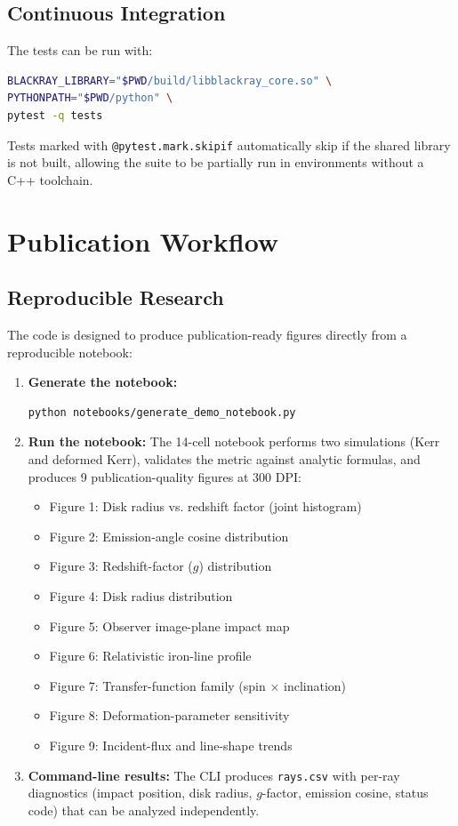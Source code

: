 \documentclass[11pt,twoside]{article}
\begin{document}
\subsection{Continuous Integration}

The tests can be run with:
\begin{lstlisting}[language=bash]
BLACKRAY_LIBRARY="$PWD/build/libblackray_core.so" \
PYTHONPATH="$PWD/python" \
pytest -q tests
\end{lstlisting}

Tests marked with \texttt{@pytest.mark.skipif} automatically skip if the shared
library is not built, allowing the suite to be partially run in environments
without a C++ toolchain.

\section{Publication Workflow}
\label{sec:workflow}

\subsection{Reproducible Research}

The code is designed to produce publication-ready figures directly from a
reproducible notebook:

\begin{enumerate}[label=\arabic*. , leftmargin=1.5em]
\item \textbf{Generate the notebook:}
\begin{lstlisting}[language=bash]
python notebooks/generate_demo_notebook.py
\end{lstlisting}

\item \textbf{Run the notebook:} The 14-cell notebook performs two simulations
(Kerr and deformed Kerr), validates the metric against analytic formulas, and
produces 9 publication-quality figures at 300 DPI:
\begin{itemize}
\item Figure 1: Disk radius vs. redshift factor (joint histogram)
\item Figure 2: Emission-angle cosine distribution
\item Figure 3: Redshift-factor ($g$) distribution
\item Figure 4: Disk radius distribution
\item Figure 5: Observer image-plane impact map
\item Figure 6: Relativistic iron-line profile
\item Figure 7: Transfer-function family (spin $\times$ inclination)
\item Figure 8: Deformation-parameter sensitivity
\item Figure 9: Incident-flux and line-shape trends
\end{itemize}

\item \textbf{Command-line results:} The CLI produces \texttt{rays.csv} with
per-ray diagnostics (impact position, disk radius, $g$-factor, emission cosine,
status code) that can be analyzed independently.
\end{enumerate}
\end{document}
